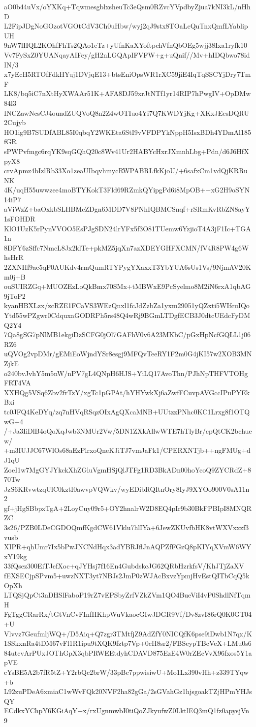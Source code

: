 aO0b44uVx/oYXKq+TqwmesgblxsheuTc3eQsm0RZvcYVpdbyZjua7kNI3kL/nHhD
L2FipJDgNoGOzotVGOtCdV3Ch0uHbw/wyj2qJ9stx8TOaLcQuTnxQmfLYablipUH
9nW7lHQL2KOhfFhTs2QAo1eTz+yUfnKaXYoftpchVfnQbOEg5wjj38Ixa1ryfk10
Vv7FySxZ0YUANqayAIFey/gH2nLGQApIFVFW+g+uQnif//Mv+hIDQbwo78idIN/3
x7yEcH5RTOfFdkHYuj1DVjqE13+btsEniOpsWR1rXC59jiE4IqTqSSCYjDry7TmF
LK8/bq5iC7nXtHyXWAAr51K+AFA8DJ59xrJtNTf1yr14RIP7hPwgIV+OpDMw84l3
INCZawNcsCJ4oundZUQVoQ8n2Z4wOTIuo4Yi7Q7KWDYjKg+XKxJEesDQRU2Cujyb
HO1ig9B7SUDfABL85I0qbqY2WKEta6StI9vVFDPYkNppH5IsxBDh4YDmAl185fGR
sPWPvfmgc6rqYK9sqGQhQ20c8Wv41Ur2HABYcHxrJXmnhLbg+Pdn/d6J6HfXpyX8
crvApmz4bIzlRb33Xo1zeaUIbqvhmycRWPABRLfkKjoU/+6safxCm1vdQjKRRuNK
4K/uqH55uwwzee4moBTYKokT3Fld69RZmkQYipgPd6i8MpOB++xG2H9oSYN14iP7
aViWzZ+baOxkbSLHBMcZDgn6MDD7V8PNhIQBMCSnqf+rSRmKvRbZN8ayY1sFOHDR
KlO1UzK5rPynVVOO5EsPJgSDN24lrYFx5f3O81TUemw6YzjioT4A3jF1Ic+TGA1n
8DFY6zSffc7NmcL8Jx2klTe+pkMZ5jqXn7azXDEYGHFXCMN/fV4R8PW4g6WhsHrR
2ZXNHf9ae5qF0AUKdv4rmQumRTYPygYXaxxT3YbYUA6sUs1Vs/9NjmAV20Km0j+B
ouSUIRZGq+MUOZEzLoQkBmx70SMx+tMBWxE9PcSyelmo8M2iN6rxA1qbAG9jToP2
kyanHBXLzx/zcRZE1FCaVS3WEzQnxl1fcJdZzbZa1yxm29051yQZxti5WIfcuIQo
Ytd55wPZgwr0CdquxaGODRPh5rs48Q4wRj9BGmLTDgfECB3J0dtcUEdcFyDMQ2Y4
7Qa8gSG7pNlMB1ekgiDzSCFG0jOl7GAFhV0v6A23MKbC/pGxHpNcfGQLL1j06RZ6
uQVOg2vpDMr/gEMiEoWjndYSr8esgj9MFQvTeeRY1F2m0G4jKI57w2XOB3MNZjkE
o240bvJvhY5m5nW/nPV7gL4QNpH6HJS+YiLQ17AvoThn/PJhNpTHFVTOHgFRT4VA
XXHQg5VSq6Zbv2frTzY/xgTc1pGPAt/hYHYwkXj6aZwfFCuvpAVGccIPuPYEkBxi
tc0JFQ4KeDYq/zq7nHVqRSqzOIxAgQXcaMNB+UUtzzPNhc0KC1Lrxg8f1OTQwG+4
/+Ja3IiDlB4oQoXqJwb3NMUr2Vw/5DN1ZXkAllwWTE7hTlyBr/cpQtCK2bchuew/
+m3IUJJC67WlOs68aEzPlrxoQneKJiTJ7vmJaFk1/CPERXNTjb++ngFMUg+dJ1qU
ZoeI1w7MgGYJYkckXhZGluVgmHSjQlJTFg1RD3BkADn00hoYcoQ9ZYCRdZ+870Tw
JzS6KRvwtzqUlC0kztI0awvpVQWkv/wyEDibRQItnOry8IyJ9XYOo900V0sA11n2
gf+jHgSBbpxTgA+2LoyCuy09r5+OY2hnalrW2D8EQ4pIr9b30BkFPBIpI8MNQRZC
3s26/PZB0LDeCGDOQmfKgdCW61Vklu7hlIYa+6JewZKUvfbHK8vtWXVxxzf3vusb
XIPR+qhUmr7Ix5bPwJNCNdHqx3adYBRJflJnAQPZfFGzQ8pKIYqXVmW6WYxY19kg
33fQsez300EiTJcfXoc+qJYHsj7f16En4GubdskcJG62QRbHzrkfsV/KhJTjZaXV
fEXSECjpSPvm5+uwzNXT3yt7NBJs2JmP0zWJAcBxvzYpmjHvEstQITbCqQ5kOpXh
LTQSjQpCt3nDHSlFaboP19rZ7vEPSbyZrfVZkZVm1QO4BueViI4vP0ShdlNfTqmH
FgTggCRarRx/tGtVnCvFInfHKhpWuVkaocGIwJDGR9Vf/Dv8zvI86rQ0K0GT04+U
Vlvvz7GeufmljWQ+/D5Aiq+Q7zgr3TMtfjZ9AdZfY0NICQfK6pse9iDwb1N7qx/K
1SSkxnRa4tDM67vFl1R1ipu9tXQK9fztp7Vp+0cH8sr2/FBSeypTBcVeX+LMu0s6
84utcvArPUxJOThGpX3qbPRWEEtdyhCDAVD875EzE4W0rZEcVvX96fxos5Y1apVE
cYsBE5A2b7fR5tZ+Y2rbQc2brW/33pBc7ppwisiwU+Mo1Lx390vHh+z339TYqw+b
L92zuPDeA6xmiaC1wWvFQk20NVF2ha82gGa/2sGVahGz1hjsgoakTZjHPmYHJsQY
ECdkxYChpY6KGiAqY+x/rxUgnmwbI0tiQoZJkyufwZ0LktlEQ3mQ1fz0apysjVn9

